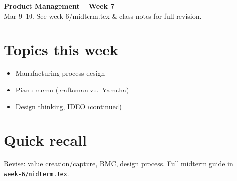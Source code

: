 \documentclass[10pt,a4paper]{article}
\begin{document}
\begin{center}
{\large\bfseries\color{eublue} Product Management -- Week 7}\\[0.2em]
\footnotesize Mar 9--10. See week-6/midterm.tex \& class notes for full revision.
\end{center}\vspace{0.5em}

\section*{\color{eublue}Topics this week}
\begin{itemize}
\item Manufacturing process design
\item Piano memo (craftsman vs.\ Yamaha)
\item Design thinking, IDEO (continued)
\end{itemize}

\section*{Quick recall}
Revise: value creation/capture, BMC, design process. Full midterm guide in \texttt{week-6/midterm.tex}.
\end{document}
